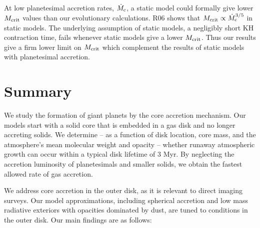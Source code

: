 \documentclass[apj, numberedappendix]{emulateapj}
\newcommand{\Eq}[1]{Equation\,(\ref{#1})}
\newcommand{\co}{_{\rm c}}
\newcommand{\MC}{M_{\rm crit}}
\begin{document}

At low planetesimal accretion rates, $\dot{M}\co$, a static model could formally give lower $\MC$ values than our evolutionary calculations.  R06 shows that $\MC \propto \dot{M}\co^{3/5}$ in static models.  The underlying assumption of static models, a negligibly short KH contraction time, fails whenever static models give a lower $\MC$.  Thus our results give a firm lower limit on $\MC$ which complement the results of static models with planetesimal accretion.

\section{Summary} \label{sec:conclusions}

We study the formation of giant planets by the core accretion mechanism.  Our models start with a solid core that is embedded in a gas disk and no longer accreting solids.  We determine -- as a function of disk location, core mass, and the atmosphere's mean molecular weight and opacity -- whether runaway atmospheric growth can occur within a typical disk lifetime of 3 Myr.  By neglecting the accretion luminosity of planetesimals and smaller solids, we obtain the fastest allowed rate of gas accretion.  

We address core accretion in the outer disk, as it is relevant to direct imaging surveys.  Our model approximations, including spherical accretion and low mass radiative exteriors with opacities dominated by dust, are tuned to conditions in the outer disk.   Our main findings are as follows:
\end{document}
